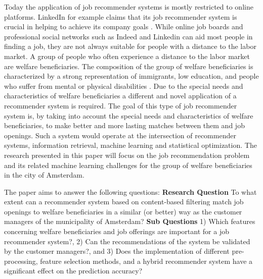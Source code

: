 Today the application of job recommender systems is mostly restricted to online platforms. 
LinkedIn for example claims that its job recommender system is crucial in helping to achieve its company goals \cite{kenthapadi2017personalized}.
While online job boards and professional social networks such as Indeed and Linkedin can aid most people in finding a job, they are not always suitable for people with a distance to the labor market.
A group of people who often experience a distance to the labor market are welfare beneficiaries. 
The composition of the group of welfare beneficiaries is characterized by a strong representation of immigrants, low education, and people who suffer from mental or physical disabilities \cite{dodeweerd}.
Due to the special needs and characteristics of welfare beneficiaries a different and novel application of a recommender system is required. 
The goal of this type of job recommender system is, by taking into account the special needs and characteristics of welfare beneficiaries, to make better and more lasting matches between them and job openings.
Such a system would operate at the intersection of recommender systems, information retrieval, machine learning and statistical optimization. 
The research presented in this paper will focus on the job recommendation problem and its related machine learning challenges for the group of welfare beneficiaries in the city of Amsterdam. 

The paper aims to answer the following questions:
\textbf{Research Question} To what extent can a recommender system based on content-based filtering match job openings to welfare beneficiaries in a similar (or better) way as the customer managers of the municipality of Amsterdam?
\textbf{Sub Questions}
1) Which features concerning welfare beneficiaries and job offerings are important for a job recommender system?, 2) Can the  recommendations of the system be validated by the customer managers?, and 3) Does the implementation of different pre-processing, feature selection methods, and a hybrid recommender system have a significant effect on the prediction accuracy?


